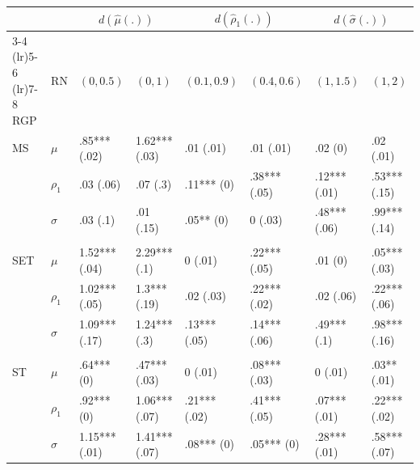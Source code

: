 \begin{tabular}{@{\extracolsep{\fill}}l|l|llllll}
\toprule
\multicolumn{2}{l}{} & \multicolumn{2}{c}{{\(d(\hat{\mu}(.))\)}} & \multicolumn{2}{c}{{\(d(\hat{\rho}_1(.))\)}} & \multicolumn{2}{c}{{\(d(\hat{\sigma}(.))\)}} \\ 
\cmidrule(lr){3-4} \cmidrule(lr){5-6} \cmidrule(lr){7-8}
RGP & RN & \((0, 0.5)\) & \((0, 1)\) & \((0.1, 0.9)\) & \((0.4, 0.6)\) & \((1, 1.5)\) & \((1, 2)\) \\ 
\midrule\addlinespace[2.5pt]
MS & \(\mu\) & .85*** (.02) & 1.62*** (.03) & .01 (.01) & .01 (.01) & .02 (0) & .02 (.01) \\ 
 & \(\rho_{1}\) & .03 (.06) & .07 (.3) & .11*** (0) & .38*** (.05) & .12*** (.01) & .53*** (.15) \\ 
 & \(\sigma\) & .03 (.1) & .01 (.15) & .05** (0) & 0 (.03) & .48*** (.06) & .99*** (.14) \\ 
 &  &  &  &  &  &  &  \\ 
SET & \(\mu\) & 1.52*** (.04) & 2.29*** (.1) & 0 (.01) & .22*** (.05) & .01 (0) & .05*** (.03) \\ 
 & \(\rho_{1}\) & 1.02*** (.05) & 1.3*** (.19) & .02 (.03) & .22*** (.02) & .02 (.06) & .22*** (.06) \\ 
 & \(\sigma\) & 1.09*** (.17) & 1.24*** (.3) & .13*** (.05) & .14*** (.06) & .49*** (.1) & .98*** (.16) \\ 
 &  &  &  &  &  &  &  \\ 
ST & \(\mu\) & .64*** (0) & .47*** (.03) & 0 (.01) & .08*** (.03) & 0 (.01) & .03** (.01) \\ 
 & \(\rho_{1}\) & .92*** (0) & 1.06*** (.07) & .21*** (.02) & .41*** (.05) & .07*** (.01) & .22*** (.02) \\ 
 & \(\sigma\) & 1.15*** (.01) & 1.41*** (.07) & .08*** (0) & .05*** (0) & .28*** (.01) & .58*** (.07) \\ 
\bottomrule
\end{tabular}
